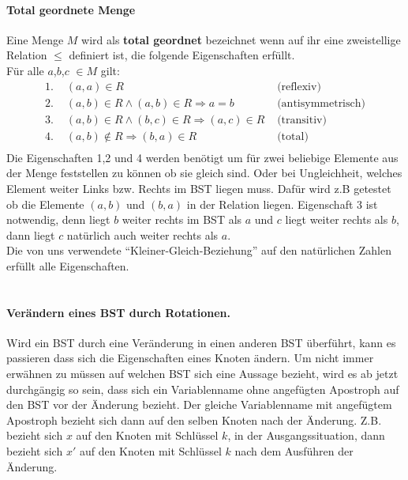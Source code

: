 \documentclass[a4paper,12pt]{article}
\begin{document}
\paragraph{Total geordnete Menge} 
Eine Menge $M$ wird als \textbf{total geordnet} bezeichnet wenn auf ihr eine zweistellige Relation $\leq$ definiert ist, die folgende Eigenschaften erfüllt.\\
Für alle $a$,$b$,$c$ $\in M$ gilt:
\begin{align*}
\text{1. } & (a,a) \in R  &\text{  (reflexiv)}\\
\text{2. } & (a,b) \in R  \land  (a,b) \in R \Rightarrow a = b  &\text{  (antisymmetrisch)}\\
\text{3. } & (a,b) \in R  \land  (b,c) \in R \Rightarrow  (a,c) \in R  &\text{  (transitiv)}\\
\text{4. } & (a,b) \notin R \Rightarrow  (b,a) \in R   &\text{  (total)}\\
\end{align*}
Die Eigenschaften 1,2 und 4 werden benötigt um für zwei beliebige Elemente aus der Menge feststellen zu können ob sie gleich sind. Oder bei Ungleichheit, welches Element weiter Links bzw. Rechts im BST liegen muss. Dafür wird z.B getestet ob die Elemente $(a,b)$ und $(b, a)$ in der Relation liegen. Eigenschaft 3 ist notwendig, denn liegt $b$ weiter rechts im BST als $a$ und $c$ liegt weiter rechts als $b$, dann liegt $c$ natürlich auch weiter rechts als $a$. \\
Die von uns verwendete \enquote{Kleiner-Gleich-Beziehung} auf den natürlichen Zahlen erfüllt alle Eigenschaften.
\\
\\




\paragraph{Verändern eines BST durch Rotationen.}
Wird ein BST durch eine Veränderung in einen anderen BST überführt, kann es passieren dass sich die Eigenschaften eines Knoten ändern. Um nicht immer erwähnen zu müssen auf welchen BST sich eine Aussage bezieht, wird es ab jetzt durchgängig so sein, dass sich ein Variablenname ohne angefügten Apostroph auf den BST vor der Änderung bezieht. Der gleiche Variablenname mit angefügtem Apostroph bezieht sich dann auf den selben Knoten nach der Änderung. Z.B. bezieht sich $x$ auf den Knoten mit Schlüssel $k$, in der Ausgangssituation, dann bezieht sich $x'$ auf den Knoten mit Schlüssel $k$ nach dem Ausführen der Änderung. \\
\end{document}
